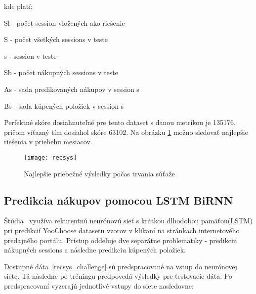 kde platí:

\begin{my_itemize}
	\item{Sl} - počet session vložených ako riešenie
	\item{S} - počet všetkých sessions v teste
	\item{s} - session v teste
	\item{Sb} - počet nákupných sessions v teste
	\item{As} - sada predikovaných nákupov v session s
	\item{Bs} - sada kúpených položiek v session s
\end{my_itemize}

Perfektné skóre dosiahnuteľné pre tento dataset s danou metrikou je 135176, pričom víťazný tím dosiahol skóre 63102. Na obrázku \ref{fig:recsys} možno sledovať najlepšie riešenia v priebehu mesiacov.

\begin{figure}[H]
	\begin{center}
		\texttt{[image: recsys]}\end{center}
	\caption[recsys]{Najlepšie priebežné výsledky počas trvania súťaže~\cite{ben2015recsys}}
	\label{fig:recsys}
\end{figure}


\subsection{Predikcia nákupov pomocou LSTM BiRNN}
\label{yoochoose_lstm}

Štúdia~\cite{wu2015neural} využíva rekurentnú neurónovú sieť s krátkou dlhodobou pamäťou(LSTM) pri predikcií YooChoose datasetu vzorov v klikaní na stránkach internetového predajného portálu. Prístup oddeľuje dve separátne problematiky - predikciu nákupných sessions a následne predikciu kúpených položiek. 

Dostupné dáta~\ref{recsys_challenge} sú predspracované na vstup do neurónovej siete. Tá následne po tréningu predpovedá výsledky pre testovacie dáta. Po predspracovaní vyzerajú jednotlivé vstupy do siete nasledovne:\newline
\linebreak


